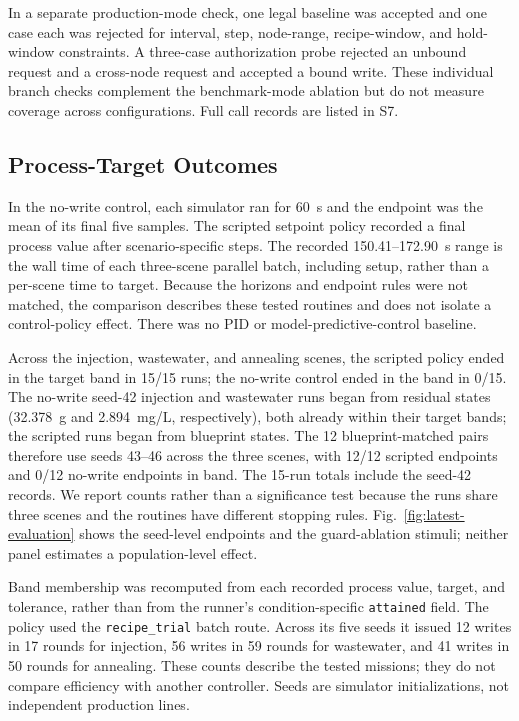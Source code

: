 In a separate production-mode check, one legal baseline was accepted and one case each was rejected for interval, step, node-range, recipe-window, and hold-window constraints. A three-case authorization probe rejected an unbound request and a cross-node request and accepted a bound write. These individual branch checks complement the benchmark-mode ablation but do not measure coverage across configurations. Full call records are listed in S7.

\subsection{Process-Target Outcomes}
\label{sec:eval-optimization}
In the no-write control, each simulator ran for 60~s and the endpoint was the mean of its final five samples. The scripted setpoint policy recorded a final process value after scenario-specific steps. The recorded 150.41--172.90~s range is the wall time of each three-scene parallel batch, including setup, rather than a per-scene time to target. Because the horizons and endpoint rules were not matched, the comparison describes these tested routines and does not isolate a control-policy effect. There was no PID or model-predictive-control baseline.

Across the injection, wastewater, and annealing scenes, the scripted policy ended in the target band in 15/15 runs; the no-write control ended in the band in 0/15. The no-write seed-42 injection and wastewater runs began from residual states (32.378~g and 2.894~mg/L, respectively), both already within their target bands; the scripted runs began from blueprint states. The 12 blueprint-matched pairs therefore use seeds 43--46 across the three scenes, with 12/12 scripted endpoints and 0/12 no-write endpoints in band. The 15-run totals include the seed-42 records. We report counts rather than a significance test because the runs share three scenes and the routines have different stopping rules. Fig.~\ref{fig:latest-evaluation} shows the seed-level endpoints and the guard-ablation stimuli; neither panel estimates a population-level effect.

Band membership was recomputed from each recorded process value, target, and tolerance, rather than from the runner's condition-specific \texttt{attained} field. The policy used the \texttt{recipe\_trial} batch route. Across its five seeds it issued 12 writes in 17 rounds for injection, 56 writes in 59 rounds for wastewater, and 41 writes in 50 rounds for annealing. These counts describe the tested missions; they do not compare efficiency with another controller. Seeds are simulator initializations, not independent production lines.

